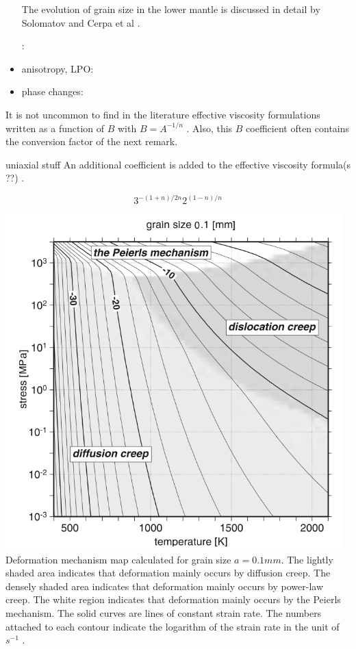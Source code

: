 \begin{itemize}
The evolution of grain size in the lower mantle is discussed in detail by Solomatov 
\cite{solo01,soet02,sore08} and Cerpa et al \cite{ceww17}.



\Literature: \cite{mube18}

\item anisotropy, LPO: 

\item phase changes:

\end{itemize}

\begin{remark}
It is not uncommon to find in the literature effective viscosity formulations written as a function 
of $B$ with $B=A^{-1/n}$ \cite{wabj08,wabj08b,wabj08c}. Also, this $B$ coefficient often contains the conversion 
factor of the next remark.
\end{remark}

\begin{remark}
uniaxial stuff 
An additional coefficient is added to the effective viscosity formula(s ??) \cite{grpy12,grpy13}.
 
\[
3^{-(1+n)/2n}2^{(1-n)/n}
\] 
\cite{ranalli}
\end{remark}

\begin{center}
\includegraphics[width=13cm]{images/rheology/defmap.png}\\
{\scriptsize Deformation mechanism map calculated for grain size $a=0.1mm$. The lightly shaded area indicates 
that deformation mainly occurs by diffusion creep. The densely shaded area indicates that 
deformation mainly occurs by power-law creep. 
The white region indicates that deformation mainly occurs by the Peierls mechanism. The 
solid curves are lines of constant strain rate. The numbers attached to each contour indicate the 
logarithm of the strain rate in the unit of $s^{-1}$ \cite{kayk99}.}
\end{center}




